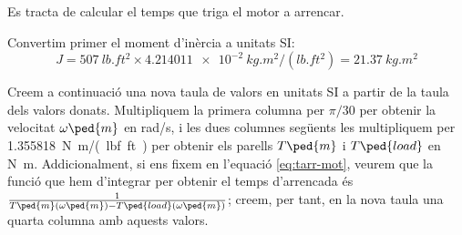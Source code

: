 \begin{exemple}
 Es tracta de calcular el temps que triga el motor a arrencar.

Convertim primer el moment d'inèrcia a unitats SI:
\[
    J =  \qty{507}{lb.ft^2} \times \qty{4,214011e-2}{kg.m^2/(lb.ft^2)}
    = \qty{21,37}{kg.m^2}
\]

Creem a continuació una nova taula de valors en unitats SI a partir de la taula dels valors donats. Multipliquem la primera columna per $\pi/30$ per obtenir la velocitat $\omega\ped{m}$ en \unit{rad/s}, i les dues columnes següents les multipliquem per \qty{1,355818}{N.m/(lbf.ft)} per obtenir els parells $T\ped{m}$ i $T\ped{load}$ en \unit{N.m}. Addicionalment, si ens fixem en l'equació \eqref{eq:tarr-mot}, veurem que la funció que hem d'integrar per obtenir el temps d'arrencada és $\frac{1}{T\ped{m}(\omega\ped{m})-T\ped{load}(\omega\ped{m})}$; creem, per tant, en la nova taula una quarta columna amb aquests valors.


\end{exemple}

